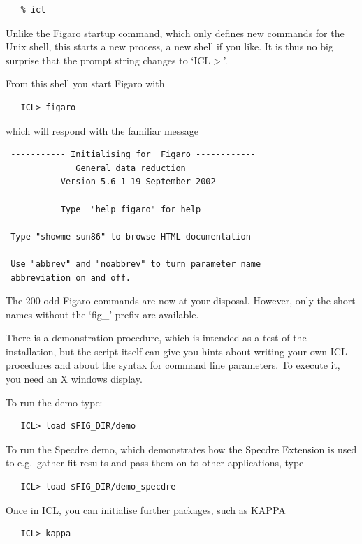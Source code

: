 \documentclass[11pt,twoside]{article}
\newcommand{\xref}[3]{#1}
\begin{document}
\begin{verbatim}
   % icl
\end{verbatim}

   Unlike the Figaro startup command, which only defines new commands
   for the Unix shell, this starts a new process, a new shell if you
   like. It is thus no big surprise that the prompt string changes to
   `ICL$>$'.

   From this shell you start Figaro with

\begin{verbatim}
   ICL> figaro
\end{verbatim}

   which will respond with the familiar message

\begin{verbatim}
 ----------- Initialising for  Figaro ------------
              General data reduction
           Version 5.6-1 19 September 2002

           Type  "help figaro" for help

 Type "showme sun86" to browse HTML documentation

 Use "abbrev" and "noabbrev" to turn parameter name
 abbreviation on and off.
\end{verbatim}

   The 200-odd Figaro commands are now at your disposal. However, only
   the short names without the `fig\_' prefix are available.

   There is a demonstration procedure, which is intended as a test of
   the installation, but the
   script itself can give you hints about writing your own ICL
   procedures and about the syntax for command line parameters.
   To execute it, you need an X windows display.

   To run the demo type:

\begin{verbatim}
   ICL> load $FIG_DIR/demo
\end{verbatim}

   To run the Specdre demo, which
   demonstrates how the Specdre Extension is used to e.g.\ gather fit
   results and pass them on to other applications, type

\begin{verbatim}
   ICL> load $FIG_DIR/demo_specdre
\end{verbatim}

   Once in ICL, you can initialise further packages, such as
\xref{KAPPA}{sun95}{}

\begin{verbatim}
   ICL> kappa
\end{verbatim}
\end{document}
